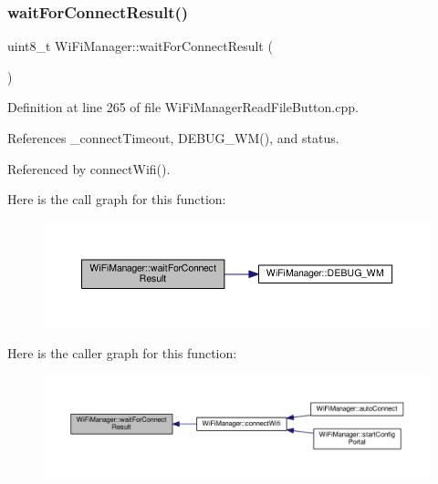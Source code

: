 \subsubsection{\texorpdfstring{wait\+For\+Connect\+Result()}{waitForConnectResult()}}
{\footnotesize\ttfamily uint8\+\_\+t Wi\+Fi\+Manager\+::wait\+For\+Connect\+Result (\begin{DoxyParamCaption}{ }\end{DoxyParamCaption})\hspace{0.3cm}{\ttfamily [private]}}



Definition at line 265 of file Wi\+Fi\+Manager\+Read\+File\+Button.\+cpp.



References \+\_\+connect\+Timeout, D\+E\+B\+U\+G\+\_\+\+W\+M(), and status.



Referenced by connect\+Wifi().

Here is the call graph for this function\+:
\nopagebreak
\begin{figure}[H]
\begin{center}
\leavevmode
\includegraphics[width=350pt]{d4/dc8/class_wi_fi_manager_a89a3f33997aa662ad223d6c150c1eede_cgraph}
\end{center}
\end{figure}
Here is the caller graph for this function\+:
\nopagebreak
\begin{figure}[H]
\begin{center}
\leavevmode
\includegraphics[width=350pt]{d4/dc8/class_wi_fi_manager_a89a3f33997aa662ad223d6c150c1eede_icgraph}
\end{center}
\end{figure}
\mbox{\label{class_wi_fi_manager_a47e4c7df7478f690c53ff9f5125c9760}} 
